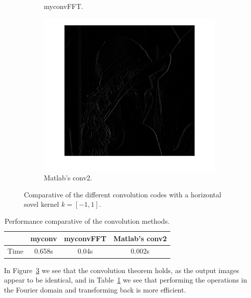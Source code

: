 \documentclass[12pt]{article}
\begin{document}
\begin{figure}[htbp]
\begin{subfigure}[b]{0.32\textwidth}
                \caption{myconvFFT.}
                \label{fig:myconvFFT}
        \end{subfigure}
        \begin{subfigure}[b]{0.32\textwidth}
                \includegraphics[width=\textwidth]{images/conv2}
                \caption{Matlab's conv2.}
                \label{fig:conv2}
        \end{subfigure}
        \caption{Comparative of the different convolution codes with a horizontal sovel kernel $k = \left[-1, 1 \right]$.}\label{fig:convolution}
\end{figure}

\begin{table}[h]
	\centering
	\begin{tabular}{|c|c|c|c|}
	\hline
     & myconv & myconvFFT & Matlab's conv2 \\ \hline
	Time & 0.658s   & 0.04s     & 0.002s   \\ \hline
	\end{tabular}
	\caption{Performance comparative of the convolution methods.}
	\label{tb:convolutionPerfomance}
\end{table}
 
In Figure~\ref{fig:convolution} we see that the convolution theorem holds, as the output images appear to be identical, and in Table~\ref{tb:convolutionPerfomance} we see that performing the operations in the Fourier domain and transforming back is more efficient.
\end{document}
